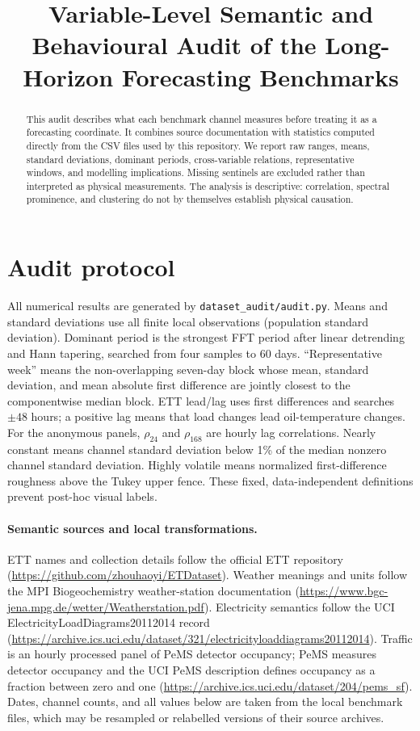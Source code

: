 \documentclass[10pt]{article}
\title{Variable-Level Semantic and Behavioural Audit of the Long-Horizon Forecasting Benchmarks}
\author{}
\date{}
\begin{document}
\maketitle

\begin{abstract}
This audit describes what each benchmark channel measures before treating it as a forecasting coordinate. It combines source documentation with statistics computed directly from the CSV files used by this repository. We report raw ranges, means, standard deviations, dominant periods, cross-variable relations, representative windows, and modelling implications. Missing sentinels are excluded rather than interpreted as physical measurements. The analysis is descriptive: correlation, spectral prominence, and clustering do not by themselves establish physical causation.
\end{abstract}

\section{Audit protocol}
All numerical results are generated by \texttt{dataset\_audit/audit.py}. Means and standard deviations use all finite local observations (population standard deviation). Dominant period is the strongest FFT period after linear detrending and Hann tapering, searched from four samples to 60 days. ``Representative week'' means the non-overlapping seven-day block whose mean, standard deviation, and mean absolute first difference are jointly closest to the componentwise median block. ETT lead/lag uses first differences and searches $\pm48$ hours; a positive lag means that load changes lead oil-temperature changes. For the anonymous panels, $\rho_{24}$ and $\rho_{168}$ are hourly lag correlations. Nearly constant means channel standard deviation below 1\% of the median nonzero channel standard deviation. Highly volatile means normalized first-difference roughness above the Tukey upper fence. These fixed, data-independent definitions prevent post-hoc visual labels.

\paragraph{Semantic sources and local transformations.}
ETT names and collection details follow the official ETT repository (\url{https://github.com/zhouhaoyi/ETDataset}). Weather meanings and units follow the MPI Biogeochemistry weather-station documentation (\url{https://www.bgc-jena.mpg.de/wetter/Weatherstation.pdf}). Electricity semantics follow the UCI ElectricityLoadDiagrams20112014 record (\url{https://archive.ics.uci.edu/dataset/321/electricityloaddiagrams20112014}). Traffic is an hourly processed panel of PeMS detector occupancy; PeMS measures detector occupancy and the UCI PeMS description defines occupancy as a fraction between zero and one (\url{https://archive.ics.uci.edu/dataset/204/pems_sf}). Dates, channel counts, and all values below are taken from the local benchmark files, which may be resampled or relabelled versions of their source archives.
\end{document}
